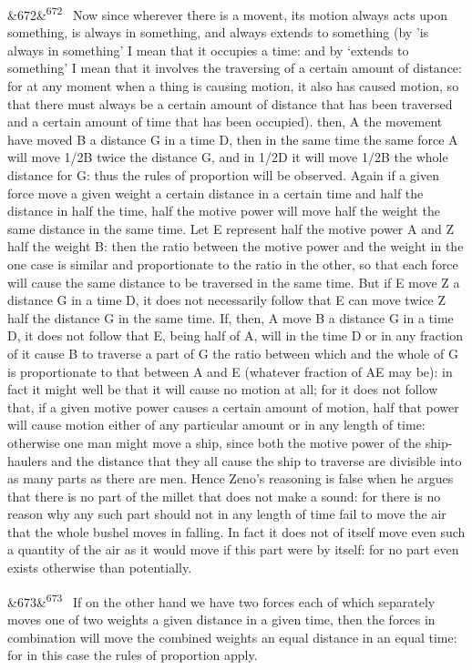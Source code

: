 \documentclass[12pt]{article}
\newcommand{\para}[1][]{\par\noindent\ifx&#1&\else\textsuperscript{\footnotesize #1}~\fi}
\begin{document}
\para[672] Now since wherever there is a movent, its motion always acts upon something, is always in something, and always extends to something (by 'is always in something’ I mean that it occupies a time: and by ‘extends to something' I mean that it involves the traversing of a certain amount of distance: for at any moment when a thing is causing motion, it also has caused motion, so that there must always be a certain amount of distance that has been traversed and a certain amount of time that has been occupied). then, A the movement have moved B a distance G in a time D, then in the same time the same force A will move 1/2B twice the distance G, and in 1/2D it will move 1/2B the whole distance for G: thus the rules of proportion will be observed. Again if a given force move a given weight a certain distance in a certain time and half the distance in half the time, half the motive power will move half the weight the same distance in the same time. Let E represent half the motive power A and Z half the weight B: then the ratio between the motive power and the weight in the one case is similar and proportionate to the ratio in the other, so that each force will cause the same distance to be traversed in the same time. But if E move Z a distance G in a time D, it does not necessarily follow that E can move twice Z half the distance G in the same time. If, then, A move B a distance G in a time D, it does not follow that E, being half of A, will in the time D or in any fraction of it cause B to traverse a part of G the ratio between which and the whole of G is proportionate to that between A and E (whatever fraction of AE may be): in fact it might well be that it will cause no motion at all; for it does not follow that, if a given motive power causes a certain amount of motion, half that power will cause motion either of any particular amount or in any length of time: otherwise one man might move a ship, since both the motive power of the ship- haulers and the distance that they all cause the ship to traverse are divisible into as many parts as there are men. Hence Zeno's reasoning is false when he argues that there is no part of the millet that does not make a sound: for there is no reason why any such part should not in any length of time fail to move the air that the whole bushel moves in falling. In fact it does not of itself move even such a quantity of the air as it would move if this part were by itself: for no part even exists otherwise than potentially.

\para[673] If on the other hand we have two forces each of which separately moves one of two weights a given distance in a given time, then the forces in combination will move the combined weights an equal distance in an equal time: for in this case the rules of proportion apply.
\end{document}
